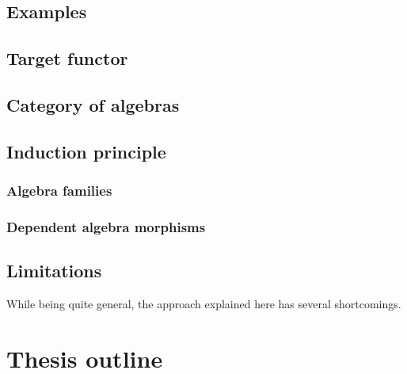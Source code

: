 \documentclass[a4paper,10pt]{article}
\begin{document}
\subsection{Examples}


\subsection{Target functor}

\subsection{Category of algebras}

\subsection{Induction principle}

\subsubsection{Algebra families}

\subsubsection{Dependent algebra morphisms}

\subsection{Limitations}

While being quite general, the approach explained here has several shortcomings.

\section{Thesis outline}
\label{sec:outline}




\end{document}
